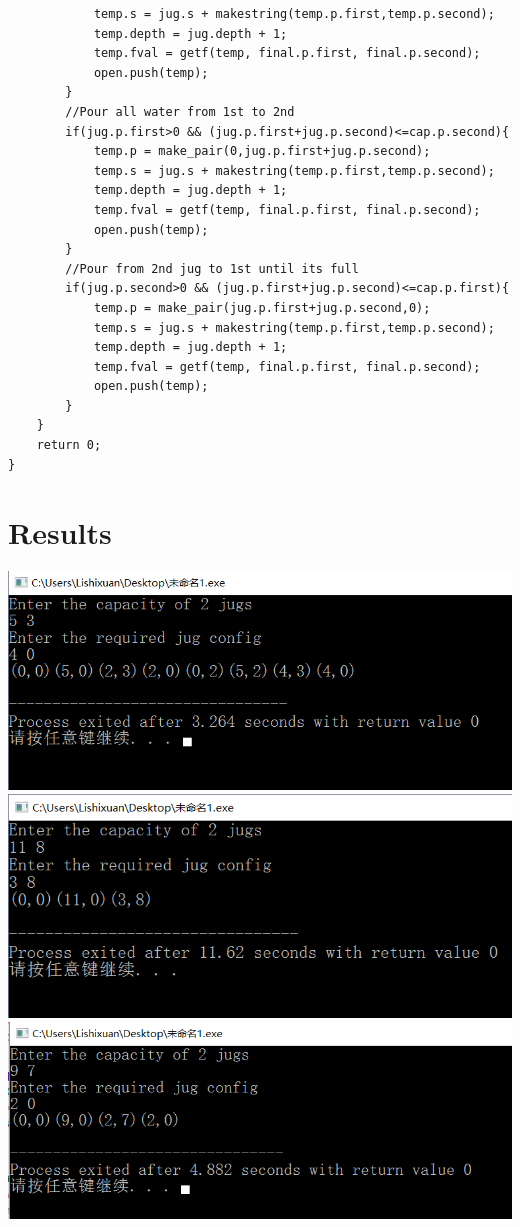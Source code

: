 \documentclass[a4paper, 11pt]{article}
\begin{document}
\begin{lstlisting}
    		temp.s = jug.s + makestring(temp.p.first,temp.p.second);
    		temp.depth = jug.depth + 1;
			temp.fval = getf(temp, final.p.first, final.p.second);
			open.push(temp);
    	}
    	//Pour all water from 1st to 2nd
    	if(jug.p.first>0 && (jug.p.first+jug.p.second)<=cap.p.second){
    		temp.p = make_pair(0,jug.p.first+jug.p.second);
    		temp.s = jug.s + makestring(temp.p.first,temp.p.second);
    		temp.depth = jug.depth + 1;
			temp.fval = getf(temp, final.p.first, final.p.second);
			open.push(temp);
    	}
    	//Pour from 2nd jug to 1st until its full
    	if(jug.p.second>0 && (jug.p.first+jug.p.second)<=cap.p.first){
    		temp.p = make_pair(jug.p.first+jug.p.second,0);
    		temp.s = jug.s + makestring(temp.p.first,temp.p.second);
    		temp.depth = jug.depth + 1;
			temp.fval = getf(temp, final.p.first, final.p.second);
			open.push(temp);
    	}
    }
	return 0;
}

\end{lstlisting}
\section{Results}
\centering
\includegraphics[width=15cm]{waterjug1.png}
\includegraphics[width=15cm]{waterjug2.png}
\includegraphics[width=15cm]{waterjug3.png}
\end{document}
